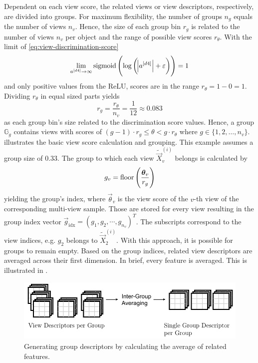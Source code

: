 Dependent on each view score, the related views or view descriptors, respectively, are divided into groups.
For maximum flexibility, the number of groups $n_g$ equals the number of views $n_v$.
Hence, the size of each group bin $r_g$ is related to the number of views $n_v$ per object and the range of possible view scores $r_\theta$.
With the limit of \eqref{eq:view-discrimination-score}
\begin{equation}
	\lim_{a^{[d4]}\rightarrow \infty} \operatorname{sigmoid}\left( \log \left( \abs{a^{[d4]}} + \varepsilon \right) \right) = 1
\end{equation}
and only positive values from the ReLU, scores are in the range $r_\theta = 1 - 0 = 1$.
Dividing $r_\theta$ in equal sized parts yields
\begin{equation}
	r_g = \frac{r_\theta}{n_v} = \frac{1}{12} \approx 0.083
\end{equation}
as each group bin's size related to the discrimination score values.
Hence, a group $\mathbb{G}_g$ contains views with scores of $(g-1) \cdot r_g \leq \theta < g \cdot r_\theta$ where $g \in \{1,2, \dots, n_v\}$.
 illustrates the basic view score calculation and grouping.
This example assumes a group size of $0.33$.
The group to which each view $\tilde{\vec{X}}^{(i)}_v$ belongs is calculated by
\begin{equation}
	g_v = \operatorname{floor} \left( \frac{\bm{\theta}_v}{r_g} \right)
\end{equation}
yielding the group's index, where $\vec{\theta}_v$ is the view score of the $v$-th view of the corresponding multi-view sample.
Those are stored for every view resulting in the group index vector $\vec{g}_{\text{idx}} = \left( g_1, g_2, \cdots, g_{n_v}\right)^T$.
The subscripts correspond to the view indices, e.g. $g_2$ belongs to $\tilde{\vec{X}}^{(i)}_2$.
With this approach, it is possible for groups to remain empty.
Based on the group indices, related view descriptors are averaged across their first dimension.
In brief, every feature is averaged.
This is illustrated in .
\begin{figure}
	\centering
	\includegraphics[]{images/grouping_module_group_descriptors.pdf}
	\caption[Generating group descriptors]{Generating group descriptors by calculating the average of related features.}
	\label{fig:grouping-module-group-descriptors}
\end{figure}
